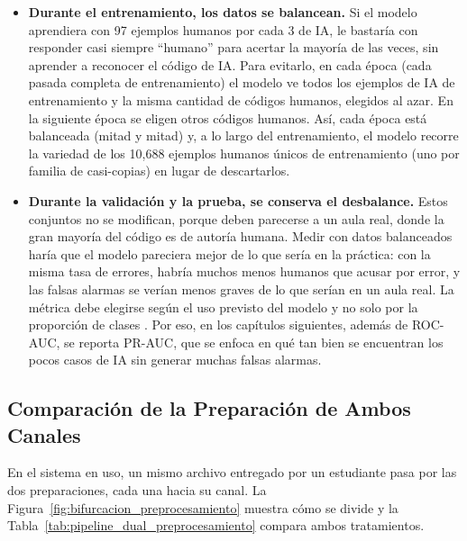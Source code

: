 \begin{itemize}
    \item \textbf{Durante el entrenamiento, los datos se balancean.} Si el modelo aprendiera con 97 ejemplos humanos por cada 3 de IA, le bastaría con responder casi siempre ``humano'' para acertar la mayoría de las veces, sin aprender a reconocer el código de IA. Para evitarlo, en cada época (cada pasada completa de entrenamiento) el modelo ve todos los ejemplos de IA de entrenamiento y la misma cantidad de códigos humanos, elegidos al azar. En la siguiente época se eligen otros códigos humanos. Así, cada época está balanceada (mitad y mitad) y, a lo largo del entrenamiento, el modelo recorre la variedad de los 10,688 ejemplos humanos únicos de entrenamiento (uno por familia de casi-copias) en lugar de descartarlos.
    \item \textbf{Durante la validación y la prueba, se conserva el desbalance.} Estos conjuntos no se modifican, porque deben parecerse a un aula real, donde la gran mayoría del código es de autoría humana. Medir con datos balanceados haría que el modelo pareciera mejor de lo que sería en la práctica: con la misma tasa de errores, habría muchos menos humanos que acusar por error, y las falsas alarmas se verían menos graves de lo que serían en un aula real. La métrica debe elegirse según el uso previsto del modelo y no solo por la proporción de clases \cite{McDermott2024AUROC}. Por eso, en los capítulos siguientes, además de ROC-AUC, se reporta PR-AUC, que se enfoca en qué tan bien se encuentran los pocos casos de IA sin generar muchas falsas alarmas.
\end{itemize}

\subsection{Comparación de la Preparación de Ambos Canales}
\label{subsec:bifurcacion_pipeline}

En el sistema en uso, un mismo archivo entregado por un estudiante pasa por las dos preparaciones, cada una hacia su canal. La Figura~\ref{fig:bifurcacion_preprocesamiento} muestra cómo se divide y la Tabla~\ref{tab:pipeline_dual_preprocesamiento} compara ambos tratamientos.

